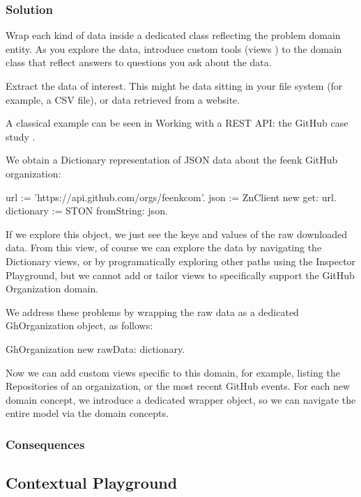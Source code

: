 \documentclass[sigconf]{acmart}
\begin{document}
\subsubsection*{Solution}
Wrap each kind of data inside a dedicated class reflecting the problem domain entity.
As you explore the data, introduce custom tools (views \etc) to the domain class that reflect answers to questions you ask about the data.

\here

Extract the data of interest. This might be data sitting in your file system (for example, a CSV file), or data retrieved from a website.

A classical example can be seen in Working with a REST API: the GitHub case study .

We obtain a Dictionary representation of JSON data about the feenk GitHub organization:

\begin{code}
url := 'https://api.github.com/orgs/feenkcom'.
json := ZnClient new get: url.
dictionary := STON fromString: json.
\end{code}
  
If we explore this object, we just see the keys and values of the raw downloaded data. From this view, of course we can explore the data by navigating the Dictionary views, or by programatically exploring other paths using the Inspector Playground, but we cannot add or tailor views to specifically support the GitHub Organization domain.

We address these problems by wrapping the raw data as a dedicated GhOrganization object, as follows:

GhOrganization new rawData: dictionary.
  
Now we can add custom views specific to this domain, for example, listing the Repositories of an organization, or the most recent GitHub events. For each new domain concept, we introduce a dedicated wrapper object, so we can navigate the entire model via the domain concepts.

\subsubsection*{Consequences}

\subsection*{Contextual Playground}\label{pat:contextualPlayground}
\end{document}
